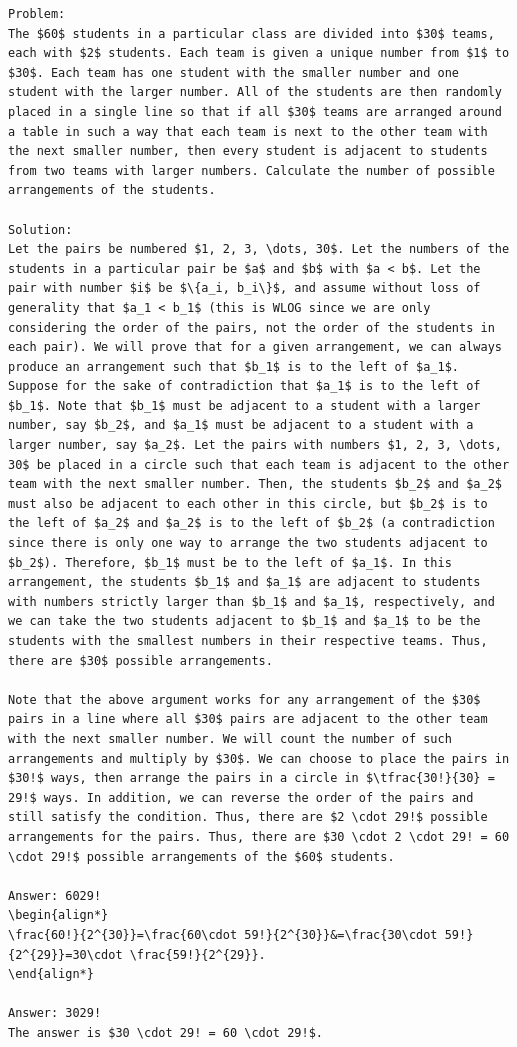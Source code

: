 \documentclass[11pt]{article}
\begin{document}
\begin{Verbatim}[breaklines=true,breakanywhere=true,fontsize=\small]
Problem:
The $60$ students in a particular class are divided into $30$ teams, each with $2$ students. Each team is given a unique number from $1$ to $30$. Each team has one student with the smaller number and one student with the larger number. All of the students are then randomly placed in a single line so that if all $30$ teams are arranged around a table in such a way that each team is next to the other team with the next smaller number, then every student is adjacent to students from two teams with larger numbers. Calculate the number of possible arrangements of the students.

Solution:
Let the pairs be numbered $1, 2, 3, \dots, 30$. Let the numbers of the students in a particular pair be $a$ and $b$ with $a < b$. Let the pair with number $i$ be $\{a_i, b_i\}$, and assume without loss of generality that $a_1 < b_1$ (this is WLOG since we are only considering the order of the pairs, not the order of the students in each pair). We will prove that for a given arrangement, we can always produce an arrangement such that $b_1$ is to the left of $a_1$. Suppose for the sake of contradiction that $a_1$ is to the left of $b_1$. Note that $b_1$ must be adjacent to a student with a larger number, say $b_2$, and $a_1$ must be adjacent to a student with a larger number, say $a_2$. Let the pairs with numbers $1, 2, 3, \dots, 30$ be placed in a circle such that each team is adjacent to the other team with the next smaller number. Then, the students $b_2$ and $a_2$ must also be adjacent to each other in this circle, but $b_2$ is to the left of $a_2$ and $a_2$ is to the left of $b_2$ (a contradiction since there is only one way to arrange the two students adjacent to $b_2$). Therefore, $b_1$ must be to the left of $a_1$. In this arrangement, the students $b_1$ and $a_1$ are adjacent to students with numbers strictly larger than $b_1$ and $a_1$, respectively, and we can take the two students adjacent to $b_1$ and $a_1$ to be the students with the smallest numbers in their respective teams. Thus, there are $30$ possible arrangements. 

Note that the above argument works for any arrangement of the $30$ pairs in a line where all $30$ pairs are adjacent to the other team with the next smaller number. We will count the number of such arrangements and multiply by $30$. We can choose to place the pairs in $30!$ ways, then arrange the pairs in a circle in $\tfrac{30!}{30} = 29!$ ways. In addition, we can reverse the order of the pairs and still satisfy the condition. Thus, there are $2 \cdot 29!$ possible arrangements for the pairs. Thus, there are $30 \cdot 2 \cdot 29! = 60 \cdot 29!$ possible arrangements of the $60$ students.

Answer: 6029!
\begin{align*}
\frac{60!}{2^{30}}=\frac{60\cdot 59!}{2^{30}}&=\frac{30\cdot 59!}{2^{29}}=30\cdot \frac{59!}{2^{29}}.
\end{align*}

Answer: 3029!
The answer is $30 \cdot 29! = 60 \cdot 29!$.
\end{Verbatim}
\clearpage
\end{document}
